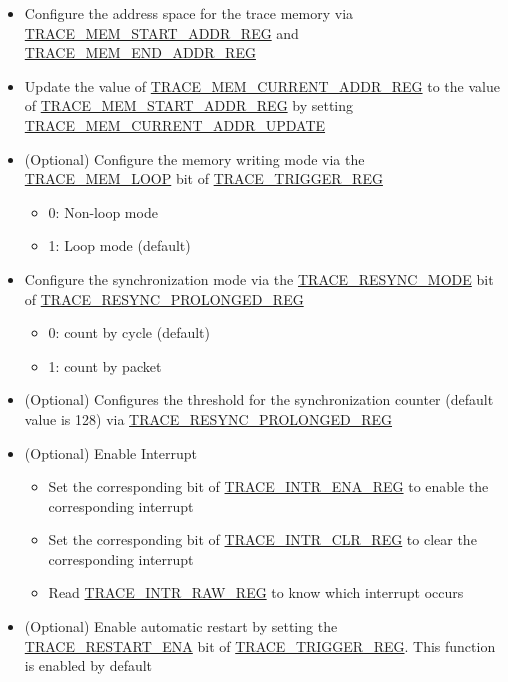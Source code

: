 \documentclass[main\_\_EN.tex]{subfiles}
\begin{document}
\begin{itemize}
    \item Configure the address space for the trace memory via \hyperref[regdesc:TRACEMEMSTARTADDRREG]{TRACE\_MEM\_START\_ADDR\_REG} and \hyperref[regdesc:TRACEMEMENDADDRREG]{TRACE\_MEM\_END\_ADDR\_REG}

    \item Update the value of \hyperref[regdesc:TRACEMEMCURRENTADDRREG]{TRACE\_MEM\_CURRENT\_ADDR\_REG} to the value of \hyperref[regdesc:TRACEMEMSTARTADDRREG]{TRACE\_MEM\_START\_ADDR\_REG} by setting \hyperref[fielddesc:TRACEMEMCURRENTADDRUPDATE]{TRACE\_MEM\_CURRENT\_ADDR\_UPDATE}


    \item (Optional) Configure the memory writing mode via the \hyperref[fielddesc:TRACEMEMLOOP]{TRACE\_MEM\_LOOP} bit of \hyperref[regdesc:TRACETRIGGERREG]{TRACE\_TRIGGER\_REG}
        \begin{itemize}
            \item 0: Non-loop mode
            \item 1: Loop mode (default)
        \end{itemize}

    \item Configure the synchronization mode via the \hyperref[fielddesc:TRACERESYNCMODE]{TRACE\_RESYNC\_MODE} bit of \hyperref[regdesc:TRACERESYNCPROLONGEDREG]{TRACE\_RESYNC\_PROLONGED\_REG}
            \begin{itemize}
                \item 0: count by cycle (default)
                \item 1: count by packet
            \end{itemize}

    \item (Optional) Configures the threshold for the synchronization counter (default value is 128) via \hyperref[regdesc:TRACERESYNCPROLONGEDREG]{TRACE\_RESYNC\_PROLONGED\_REG}


    \item (Optional) Enable Interrupt
        \begin{itemize}
            \item Set the corresponding bit of \hyperref[regdesc:TRACEINTRENAREG]{TRACE\_INTR\_ENA\_REG} to enable the corresponding interrupt
            \item Set the corresponding bit of \hyperref[regdesc:TRACEINTRCLRREG]{TRACE\_INTR\_CLR\_REG} to clear the corresponding interrupt
            \item Read \hyperref[regdesc:TRACEINTRRAWREG]{TRACE\_INTR\_RAW\_REG} to know which interrupt occurs
        \end{itemize}
    \item (Optional) Enable automatic restart by setting the \hyperref[fielddesc:TRACERESTARTENA]{TRACE\_RESTART\_ENA} bit of \hyperref[regdesc:TRACETRIGGERREG]{TRACE\_TRIGGER\_REG}. This function is enabled by default



\end{itemize}
\end{document}
